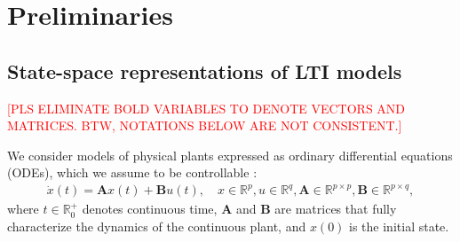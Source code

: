 \documentclass[sigconf]{llncs}
\newcommand{\mat}[1]{\boldsymbol{#1}}
\renewcommand{\vec}[1]{\boldsymbol{#1}}
\renewcommand{\note}[1]{\textcolor{red}{[#1]}}
\begin{document}
\section{Preliminaries}
\label{sec:preliminaries}

\subsection{State-space representations of LTI models}
\label{sec:ssrepresentation}


\note{PLS ELIMINATE BOLD VARIABLES TO DENOTE VECTORS AND MATRICES. BTW, NOTATIONS BELOW ARE NOT CONSISTENT.}

We consider models of physical plants expressed as ordinary differential
equations (ODEs), which we assume to be controllable \cite{Astrom08,astrom1997computer}:
%
\begin{align}
\label{eq:ode1}
\dot{x}(t) = \mat{A}x(t)+ \mat{B} u(t), \quad x \in \mathbb{R}^p, u \in \mathbb{R}^q, \mat{A} \in \mathbb{R}^{p \times p}, \mat{B} \in \mathbb{R}^{p \times q},
\end{align}
%
where $t \in \mathbb R_0^+$ denotes continuous time, 
$\mat{A}$ and $\mat{B}$ are matrices that fully characterize the dynamics of the continuous plant, 
and $x(0)$ is the initial state. 
\end{document}
